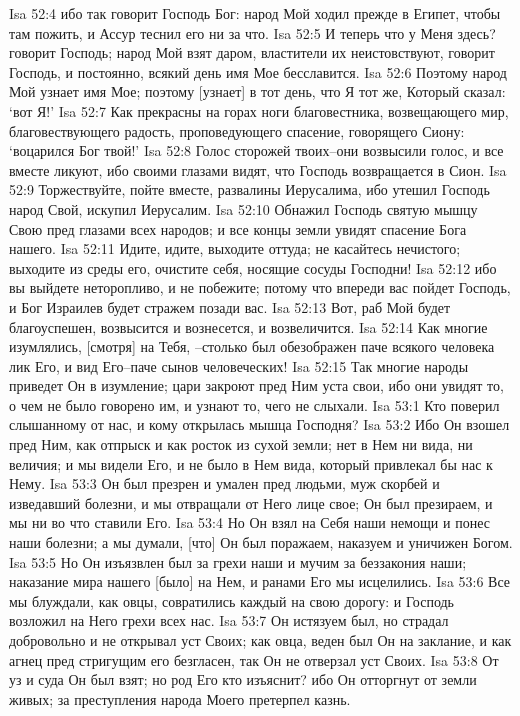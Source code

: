 Isa 52:4  ибо так говорит Господь Бог: народ Мой ходил прежде в Египет, чтобы там пожить, и Ассур теснил его ни за что.
Isa 52:5  И теперь что у Меня здесь? говорит Господь; народ Мой взят даром, властители их неистовствуют, говорит Господь, и постоянно, всякий день имя Мое бесславится.
Isa 52:6  Поэтому народ Мой узнает имя Мое; поэтому [узнает] в тот день, что Я тот же, Который сказал: `вот Я!'
Isa 52:7  Как прекрасны на горах ноги благовестника, возвещающего мир, благовествующего радость, проповедующего спасение, говорящего Сиону: `воцарился Бог твой!'
Isa 52:8  Голос сторожей твоих--они возвысили голос, и все вместе ликуют, ибо своими глазами видят, что Господь возвращается в Сион.
Isa 52:9  Торжествуйте, пойте вместе, развалины Иерусалима, ибо утешил Господь народ Свой, искупил Иерусалим.
Isa 52:10  Обнажил Господь святую мышцу Свою пред глазами всех народов; и все концы земли увидят спасение Бога нашего.
Isa 52:11  Идите, идите, выходите оттуда; не касайтесь нечистого; выходите из среды его, очистите себя, носящие сосуды Господни!
Isa 52:12  ибо вы выйдете неторопливо, и не побежите; потому что впереди вас пойдет Господь, и Бог Израилев будет стражем позади вас.
Isa 52:13  Вот, раб Мой будет благоуспешен, возвысится и вознесется, и возвеличится.
Isa 52:14  Как многие изумлялись, [смотря] на Тебя, --столько был обезображен паче всякого человека лик Его, и вид Его--паче сынов человеческих!
Isa 52:15  Так многие народы приведет Он в изумление; цари закроют пред Ним уста свои, ибо они увидят то, о чем не было говорено им, и узнают то, чего не слыхали.
Isa 53:1  Кто поверил слышанному от нас, и кому открылась мышца Господня?
Isa 53:2  Ибо Он взошел пред Ним, как отпрыск и как росток из сухой земли; нет в Нем ни вида, ни величия; и мы видели Его, и не было в Нем вида, который привлекал бы нас к Нему.
Isa 53:3  Он был презрен и умален пред людьми, муж скорбей и изведавший болезни, и мы отвращали от Него лице свое; Он был презираем, и мы ни во что ставили Его.
Isa 53:4  Но Он взял на Себя наши немощи и понес наши болезни; а мы думали, [что] Он был поражаем, наказуем и уничижен Богом.
Isa 53:5  Но Он изъязвлен был за грехи наши и мучим за беззакония наши; наказание мира нашего [было] на Нем, и ранами Его мы исцелились.
Isa 53:6  Все мы блуждали, как овцы, совратились каждый на свою дорогу: и Господь возложил на Него грехи всех нас.
Isa 53:7  Он истязуем был, но страдал добровольно и не открывал уст Своих; как овца, веден был Он на заклание, и как агнец пред стригущим его безгласен, так Он не отверзал уст Своих.
Isa 53:8  От уз и суда Он был взят; но род Его кто изъяснит? ибо Он отторгнут от земли живых; за преступления народа Моего претерпел казнь.
